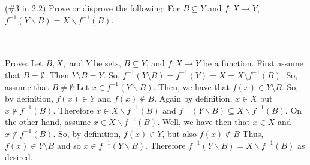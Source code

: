 (\#3 in 2.2) Prove or disprove the following: For $B\subseteq Y$ and $f:X\to Y$,
$f^{-1}(Y\backslash B)=X\backslash f^{-1}(B)$.\\\\

\begin{solution}\renewcommand{\qedsymbol}{}\ \\
    Prove: Let $B, X,$ and $Y$ be sets, $B\subseteq Y$, and $f:X\rightarrow Y$ be a function. First
    assume that $B=\emptyset$. Then $Y\setminus B=Y$. So,
    $f^{-1}(Y\setminus B)=f^{-1}(Y)=X=X\setminus f^{-1}(B)$. So, assume that $B\neq\emptyset$ Let
    $x\in f^{-1}(Y\backslash B)$. Then, we have that $f(x)\in Y\setminus B$. So, by definition,
    $f(x)\in Y$ and $f(x)\notin B$. Again by definition, $x\in X$ but $x\notin f^{-1}(B)$. Therefore
    $x\in X\backslash f^{-1}(B)$ and $f^{-1}(Y\backslash B)\subseteq X\backslash f^{-1}(B)$. On the
    other hand, assume $x\in X\backslash f^{-1}(B)$. Well, we have then that $x\in X$ and
    $x\notin f^{-1}(B)$. So, by definition, $f(x)\in Y$, but also $f(x)\notin B$ Thus,
    $f(x)\in Y\setminus B$ and so $x\in f^{-1}(Y\backslash B)$. Therefore
    $f^{-1}(Y\backslash B)=X\backslash f^{-1}(B)$ as desired.

\end{solution}